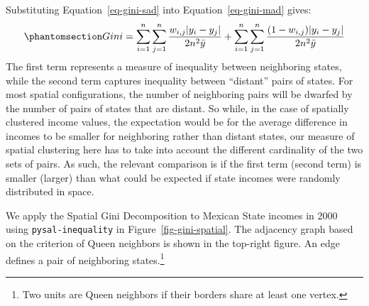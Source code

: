 \documentclass[
  a4paper, 
  twoside,
  final
]{article}
\begin{document}
Substituting Equation~\ref{eq-gini-sad} into Equation~\ref{eq-gini-mad}
gives: \begin{equation}\phantomsection\label{eq-gini-spatial}{
Gini = \sum_{i=1}^n \sum_{j=1}^n \frac{w_{i,j} |y_i - y_j|}{2n^2 \bar{y}} +
\sum_{i=1}^n \sum_{j=1}^n \frac{ (1-w_{i,j}) |y_i - y_j|}{2n^2 \bar{y}}
}\end{equation} The first term represents a measure of inequality
between neighboring states, while the second term captures inequality
between ``distant'' pairs of states. For most spatial configurations,
the number of neighboring pairs will be dwarfed by the number of pairs
of states that are distant. So while, in the case of spatially clustered
income values, the expectation would be for the average difference in
incomes to be smaller for neighboring rather than distant states, our
measure of spatial clustering here has to take into account the
different cardinality of the two sets of pairs. As such, the relevant
comparison is if the first term (second term) is smaller (larger) than
what could be expected if state incomes were randomly distributed in
space.

We apply the Spatial Gini Decomposition to Mexican State incomes in 2000
using \texttt{pysal-inequality} in Figure~\ref{fig-gini-spatial}. The
adjacency graph based on the criterion of Queen neighbors is shown in
the top-right figure. An edge defines a pair of neighboring
states.\footnote{Two units are Queen neighbors if their borders share at
  least one vertex.}
\end{document}
